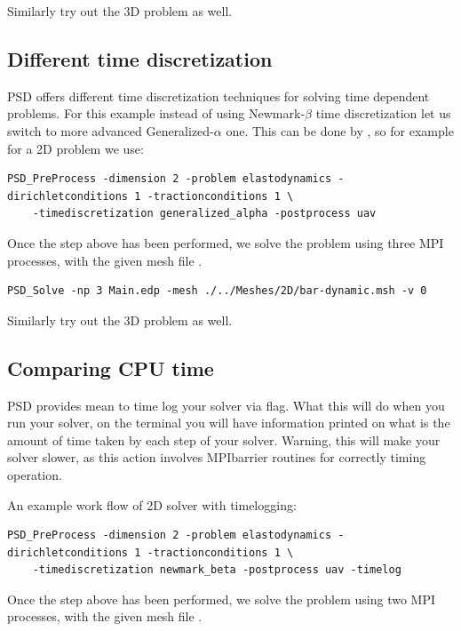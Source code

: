 {{Similarly try out the 3D problem as well.

\subsection{Different time discretization}

PSD offers different time discretization techniques for solving time dependent problems. For this example instead of using Newmark-$\beta$ time  discretization let us switch to more advanced Generalized-$\alpha$ one. This can be done by , so for example for a 2D problem we use:

\begin{lstlisting}[style=BashInputStyle]
	PSD_PreProcess -dimension 2 -problem elastodynamics -dirichletconditions 1 -tractionconditions 1 \
	-timediscretization generalized_alpha -postprocess uav
\end{lstlisting}

Once the step above has been performed, we solve the problem using three MPI processes, with the given mesh file . 

\begin{lstlisting}[style=BashInputStyle]
	PSD_Solve -np 3 Main.edp -mesh ./../Meshes/2D/bar-dynamic.msh -v 0
\end{lstlisting}

Similarly try out the 3D problem as well.

\subsection{Comparing CPU time}

PSD provides mean to time log your solver via  flag. What this will do when you run your solver, on the terminal you will have information printed on what is the amount of time taken by each step of your solver. Warning, this will make your solver slower, as this action involves MPIbarrier routines for correctly timing operation. 

An example work flow of 2D solver with timelogging:

\begin{lstlisting}[style=BashInputStyle]
	PSD_PreProcess -dimension 2 -problem elastodynamics -dirichletconditions 1 -tractionconditions 1 \
	-timediscretization newmark_beta -postprocess uav -timelog
\end{lstlisting}

Once the step above has been performed, we solve the problem using two MPI processes, with the given mesh file . 

}}
